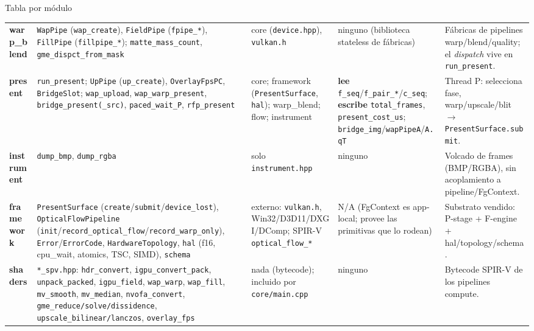 \documentclass[aspectratio=169]{beamer}
\newcommand{\Lwarp}[1]{\textcolor{warpCol}{\textbf{#1}}}
\newcommand{\Lpres}[1]{\textcolor{presCol}{\textbf{#1}}}
\newcommand{\Linst}[1]{\textcolor{instCol}{\textbf{#1}}}
\newcommand{\Lfw}[1]{\textcolor{fwCol}{\textbf{#1}}}
\newcommand{\Lshd}[1]{\textcolor{shCol}{\textbf{#1}}}
\begin{document}
\begin{frame}[allowframebreaks]{Tabla por m\'odulo}
\begin{longtable}{p{1.35cm} p{2.85cm} p{2.35cm} p{2.65cm} p{2.55cm}}
\Lwarp{warp\_blend} &
\texttt{WapPipe} (\texttt{wap\_create}), \texttt{FieldPipe} (\texttt{fpipe\_*}), \texttt{FillPipe} (\texttt{fillpipe\_*}); \texttt{matte\_mass\_count}, \texttt{gme\_dispct\_from\_mask} &
core (\texttt{device.hpp}), \texttt{vulkan.h} &
ninguno (biblioteca stateless de f\'abricas) &
F\'abricas de pipelines warp/blend/quality; el \emph{dispatch} vive en \texttt{run\_present}. \\

\Lpres{present} &
\texttt{run\_present}; \texttt{UpPipe} (\texttt{up\_create}), \texttt{OverlayFpsPC}, \texttt{BridgeSlot}; \texttt{wap\_upload}, \texttt{wap\_warp\_present}, \texttt{bridge\_present(\_src)}, \texttt{paced\_wait\_P}, \texttt{rfp\_present} &
core; framework (\texttt{PresentSurface}, \texttt{hal}); warp\_blend; flow; instrument &
\textbf{lee} \texttt{f\_seq}/\texttt{f\_pair\_*}/\texttt{c\_seq}; \textbf{escribe} \texttt{total\_frames}, \texttt{present\_cost\_us}; \texttt{bridge\_img}/\texttt{wapPipeA}/\texttt{A.qT} &
Thread P: selecciona fase, warp/upscale/blit $\to$ \texttt{PresentSurface.submit}. \\

\Linst{instrument} &
\texttt{dump\_bmp}, \texttt{dump\_rgba} &
solo \texttt{instrument.hpp} &
ninguno &
Volcado de frames (BMP/RGBA), sin acoplamiento a pipeline/FgContext. \\

\Lfw{framework} &
\texttt{PresentSurface} (\texttt{create}/\texttt{submit}/\texttt{device\_lost}), \texttt{OpticalFlowPipeline} (\texttt{init}/\texttt{record\_optical\_flow}/\texttt{record\_warp\_only}), \texttt{Error}/\texttt{ErrorCode}, \texttt{HardwareTopology}, \texttt{hal} (f16, cpu\_wait, atomics, TSC, SIMD), \texttt{schema} &
externo: \texttt{vulkan.h}, Win32/D3D11/DXGI/DComp; SPIR-V \texttt{optical\_flow\_*} &
N/A (FgContext es app-local; provee las primitivas que lo rodean) &
Substrato vendido: P-stage + F-engine + hal/topology/schema. \\

\Lshd{shaders} &
\texttt{*\_spv.hpp}: \texttt{hdr\_convert}, \texttt{igpu\_convert\_pack}, \texttt{unpack\_packed}, \texttt{igpu\_field}, \texttt{wap\_warp}, \texttt{wap\_fill}, \texttt{mv\_smooth}, \texttt{mv\_median}, \texttt{nvofa\_convert}, \texttt{gme\_reduce/solve/dissidence}, \texttt{upscale\_bilinear/lanczos}, \texttt{overlay\_fps} &
nada (bytecode); incluido por \texttt{core/main.cpp} &
ninguno &
Bytecode SPIR-V de los pipelines compute. \\

\end{longtable}
\end{frame}
\end{document}
